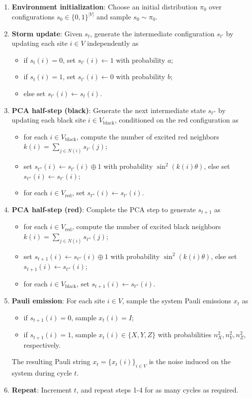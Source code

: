 \documentclass[
    aps,
    prx,
    reprint,
    superscriptaddress,
    longbibliography,
    nofootinbib,
    floatfix,
]{revtex4-2}
\begin{document}
\begin{enumerate}
    \item[0.] \textbf{Environment initialization}: Choose an initial distribution \(\pi_0\) over configurations \(s_0\in\{0,1\}^{|V|}\) and sample \(s_{0}\sim\pi_0\).

    \item \textbf{Storm update}: Given \(s_{t}\), generate the intermediate configuration \(s_{t'}\) by updating each site \(i\in V\) independently as
    \begin{itemize}
        \item if \(s_{t}(i) = 0\), set \(s_{t'}(i) \gets 1\) with probability \(a\);
        \item if \(s_{t}(i) = 1\), set \(s_{t'}(i) \gets 0\) with probability \(b\);
        \item else set \(s_{t'}(i) \gets s_{t}(i)\).
    \end{itemize}
    \item \textbf{PCA half-step (black)}: Generate the next intermediate state \(s_{t''}\) by updating each black site \(i\in V_\mathrm{black}\), conditioned on the red configuration as
    \begin{itemize}
        \item for each \(i \in V_\mathrm{black}\), compute the number of excited red neighbors \(k(i) = \sum_{j \in N(i)} s_{t'}(j)\);
        \item set \(s_{t''}(i) \gets s_{t'}(i) \oplus 1\) with probability \(\sin^2(k(i)\theta)\), else set \(s_{t''}(i) \gets s_{t'}(i)\);
        \item for each \(i \in V_\mathrm{red}\), set \(s_{t''}(i) \gets s_{t'}(i)\).
    \end{itemize}
    \item \textbf{PCA half-step (red)}: Complete the PCA step to generate \(s_{t+1}\) as
    \begin{itemize}
        \item for each \(i \in V_\mathrm{red}\), compute the number of excited black neighbors \(k(i) = \sum_{j \in N(i)} s_{t''}(j)\);
        \item set \(s_{t+1}(i) \gets s_{t''}(i) \oplus 1\) with probability \(\sin^2(k(i)\theta)\), else set \(s_{t+1}(i) \gets s_{t''}(i)\);
        \item for each \(i \in V_\mathrm{black}\), set \(s_{t+1}(i) \gets s_{t''}(i)\).
    \end{itemize}
    \item \textbf{Pauli emission}: For each site \(i\in V\), sample the system Pauli emissions \(x_t\) as
    \begin{itemize}
        \item if \(s_{t+1}(i) = 0\), sample \(x_t(i)=I\);
        \item if \(s_{t+1}(i) = 1\), sample \(x_t(i) \in \{X, Y, Z\}\) with probabilities \(n_X^2, n_Y^2, n_Z^2\), respectively.
    \end{itemize}
    The resulting Pauli string \(x_t = \{x_t(i)\}_{i\in V}\) is the noise induced on the system during cycle \(t\).
    \item \textbf{Repeat}: Increment \(t\), and repeat steps 1-4 for as many cycles as required.
\end{enumerate}
\end{document}
